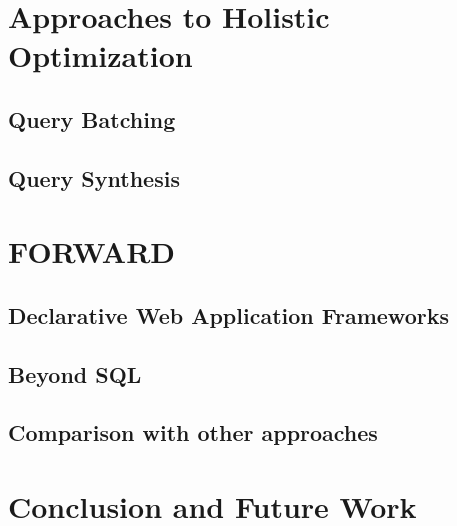 \documentclass[10pt]{article}
\begin{document}


\section{Approaches to Holistic Optimization}

\subsection{Query Batching}



\subsection{Query Synthesis}



\section{FORWARD}

\subsection{Declarative Web Application Frameworks}



\subsection{Beyond SQL}



\subsection{Comparison with other approaches}



\section{Conclusion and Future Work}



{}

\end{document}
